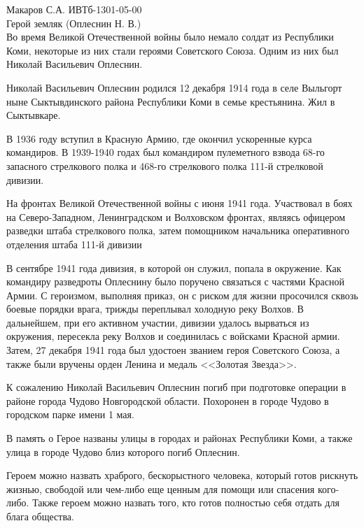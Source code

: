 \documentclass[a4paper,14pt]{extarticle}
\begin{document}
	\pagestyle{empty}
	\noindent Макаров С.А. ИВТб-1301-05-00 \\
	Герой земляк (Оплеснин Н. В.) \\
	
	Во время Великой Отечественной войны было немало солдат из Республики Коми, некоторые из них стали героями Советского Союза. Одним из них был Николай Васильевич Оплеснин.
	
	Николай Васильевич Оплеснин родился 12 декабря 1914 года в селе Выльгорт ныне Сыктывдинского района Республики Коми в семье крестьянина. Жил в Сыктывкаре.
	
	В 1936 году вступил в Красную Армию, где окончил ускоренные курса командиров. В 1939-1940 годах был командиром пулеметного взвода 68-го запасного стрелкового полка и 468-го стрелкового полка 111-й стрелковой дивизии.
	
	На фронтах Великой Отечественной войны с июня 1941 года. Участвовал в боях на Северо-Западном, Ленинградском и Волховском фронтах, являясь офицером разведки штаба стрелкового полка, затем помощником начальника оперативного отделения штаба 111-й дивизии
	
	В сентябре 1941 года дивизия, в которой он служил, попала в окружение. Как командиру разведроты Оплеснину было поручено связаться с частями Красной Армии. С героизмом, выполняя приказ, он с риском для жизни просочился сквозь боевые порядки врага, трижды переплывал холодную реку Волхов. В дальнейшем, при его активном участии, дивизии удалось вырваться из окружения, пересекла реку Волхов и соединилась с войсками Красной армии. Затем, 27 декабря 1941 года был удостоен званием героя Советского Союза, а также были вручены орден Ленина и медаль <<Золотая Звезда>>.
	
	К сожалению Николай Васильевич Оплеснин погиб при подготовке операции в районе города Чудово Новгородской области. Похоронен в городе Чудово в городском парке имени 1 мая. 
	
	В память о Герое названы улицы в городах и районах Республики Коми, а также улица в городе Чудово близ которого погиб Оплеснин.
	
	Героем можно назвать храброго, бескорыстного человека, который готов рискнуть жизнью, свободой или чем-либо еще ценным для помощи или спасения кого-либо. Также героем можно назвать того, кто готов полностью себя отдать для блага общества.
\end{document}
